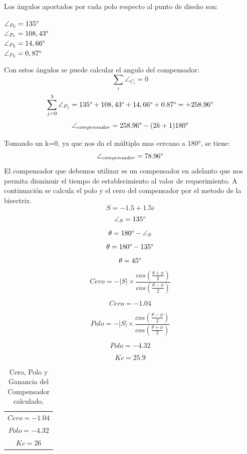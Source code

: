 \documentclass[a4paper,11pt]{article}
\begin{document}
Los ángulos aportados por cada polo respecto al punto de diseño son:\\
\begin{center}
$\angle_{P_0}=135\degree$\\
$\angle_{P_1}=108,43\degree$\\
$\angle_{P_2}=14,66\degree$\\
$\angle_{P_3}=0,87\degree$\\
\end{center}


Con estos ángulos se puede calcular el angulo del compensador:
$$\sum_{i}\angle_{C_i}=0$$
$$\sum_{j=0}^{3}\angle_{P_j}=135\degree+108,43\degree+14,66\degree+0.87\degree = +258.96\degree$$
$$\angle_{compensador} = 258.96\degree - (2k+1)180\degree$$

Tomando un k=0, ya que nos da el múltiplo mas cercano a 180°, se tiene:
$$\angle_{compensador} =78.96\degree$$
El compensador que debemos utilizar es un compensador en adelanto que nos permita disminuir el tiempo de establecimiento al valor de requerimiento.
A continuación se calcula el polo y el cero del compensador por el metodo de la bisectriz.
$$S = -1.5+1.5i$$
$$\angle_S=135\degree$$
$$\theta=180\degree-\angle_S$$
$$\theta=180\degree-135\degree$$
$$\theta=45\degree$$
$$Cero=-|S|\times\frac{cos(\frac{\theta+\phi}{2})}{cos(\frac{\theta-\phi}{2})}$$

$$Cero = -1.04$$

$$Polo=-|S|\times\frac{cos(\frac{\theta-\phi}{2})}{cos(\frac{\theta+\phi}{2})}$$

$$Polo = -4.32$$



$$Kc=25.9$$


\begin{table}[h!]
\centering
\caption{Cero, Polo y Ganancia del Compensador calculado.}
\begin{tabular}{c}
\hline
\hline 
$\displaystyle Cero = -1.04$\tabularnewline
$\displaystyle Polo = -4.32$\tabularnewline
$\displaystyle Kc=26$\tabularnewline
\hline
\hline
\end{tabular}
\end{table}
\end{document}
